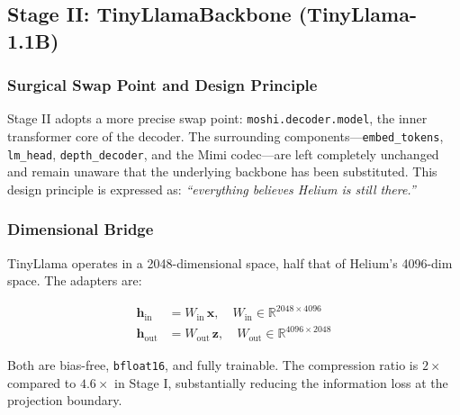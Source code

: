\documentclass[conference]{IEEEtran}
\begin{document}
\subsection{Stage II: TinyLlamaBackbone (TinyLlama-1.1B)}
\label{sec:method_s2}

\subsubsection{Surgical Swap Point and Design Principle}

Stage II adopts a more precise swap point: \texttt{moshi.decoder.model},
the inner transformer core of the decoder.
The surrounding components---\texttt{embed\_tokens}, \texttt{lm\_head},
\texttt{depth\_decoder}, and the Mimi codec---are left completely unchanged
and remain unaware that the underlying backbone has been substituted.
This design principle is expressed as: \emph{``everything believes Helium is
still there.''}

\subsubsection{Dimensional Bridge}

TinyLlama operates in a 2048-dimensional space, half that of Helium's 4096-dim
space. The adapters are:

\begin{align}
  \mathbf{h}_{\text{in}}  &= W_{\text{in}}\,\mathbf{x},
    \quad W_{\text{in}}  \in \mathbb{R}^{2048 \times 4096} \label{eq:win3} \\
  \mathbf{h}_{\text{out}} &= W_{\text{out}}\,\mathbf{z},
    \quad W_{\text{out}} \in \mathbb{R}^{4096 \times 2048} \label{eq:wout3}
\end{align}

Both are bias-free, \texttt{bfloat16}, and fully trainable.
The compression ratio is $2\times$ compared to $4.6\times$ in Stage I,
substantially reducing the information loss at the projection boundary.
\end{document}
